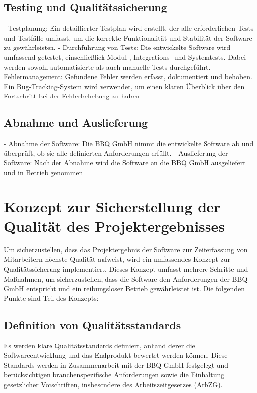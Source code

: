 \documentclass[12pt]{article}
\begin{document}
	\subsection{Testing und Qualitätssicherung}
	- Testplanung: Ein detaillierter Testplan wird erstellt, der alle erforderlichen Tests und Testfälle umfasst, um die korrekte Funktionalität und Stabilität der Software zu gewährleisten.
	- Durchführung von Tests: Die entwickelte Software wird umfassend getestet, einschließlich Modul-, Integrations- und Systemtests. Dabei werden sowohl automatisierte als auch manuelle Tests durchgeführt.
	- Fehlermanagement: Gefundene Fehler werden erfasst, dokumentiert und behoben. Ein Bug-Tracking-System wird verwendet, um einen klaren Überblick über den Fortschritt bei der Fehlerbehebung zu haben.
	
	\subsection{Abnahme und Auslieferung}
	- Abnahme der Software: Die BBQ GmbH nimmt die entwickelte Software ab und überprüft, ob sie alle definierten Anforderungen erfüllt.
	- Auslieferung der Software: Nach der Abnahme wird die Software an die BBQ GmbH ausgeliefert und in Betrieb genommen
	
	\section{Konzept zur Sicherstellung der Qualität des Projektergebnisses}
	Um sicherzustellen, dass das Projektergebnis der Software zur Zeiterfassung von Mitarbeitern höchste Qualität aufweist, wird ein umfassendes Konzept zur Qualitätssicherung implementiert. Dieses Konzept umfasst mehrere Schritte und Maßnahmen, um sicherzustellen, dass die Software den Anforderungen der BBQ GmbH entspricht und ein reibungsloser Betrieb gewährleistet ist. Die folgenden Punkte sind Teil des Konzepts:
	
	\subsection{Definition von Qualitätsstandards}
	 Es werden klare Qualitätsstandards definiert, anhand derer die Softwareentwicklung und das Endprodukt bewertet werden können. Diese Standards werden in Zusammenarbeit mit der BBQ GmbH festgelegt und berücksichtigen branchenspezifische Anforderungen sowie die Einhaltung gesetzlicher Vorschriften, insbesondere des Arbeitszeitgesetzes (ArbZG).
	
\end{document}
